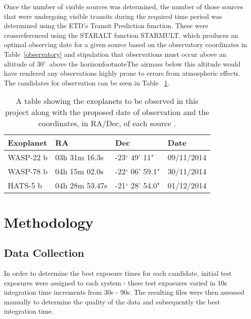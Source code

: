 \documentclass[twoside,4pt]{article}
\begin{document}
\begin{multicols}{2}
Once the number of visible sources was determined, the number of those sources that were undergoing visible transits during the required time period was determined using the ETD's Transit Prediction function. These were crossreferenced using the STARALT function STARMULT, which produces an optimal observing date for a given source based on the observatory coordinates in Table~\ref{observatory} and stipulation that observations must occur above an altitude of 30$^\circ$\ above the horizonfootnote{The airmass below this altitude would have rendered any observations highly prone to errors from atmospheric effects}. The candidates for observation can be seen in Table ~\ref{planets}.

\begin{table}[H]
    \centering
    \begin{tabular}{ | l | l | l | l | }
    \hline \hline
    Exoplanet & RA & Dec & Date       \\ \hline \hline
    WASP-22 b    & 03h 31m 16.3s & -23$^\circ$ 49' 11" & 09/11/2014 \\
    WASP-78 b   & 04h 15m 02.0s & -22$^\circ$ 06' 59.1" & 30/11/2014 \\
    HATS-5 b  & 04h 28m 53.47s & -21$^\circ$ 28' 54.0" & 01/12/2014 \\
    \hline
    \end{tabular}
    \caption{A table showing the exoplanets to be observed in this project along with the proposed date of observation and the coordinates, in RA/Dec, of each source \parencite{etd}.}
    \label{planets}
\end{table}


\section{Methodology}
\subsection{Data Collection}
In order to determine the best exposure times for each candidate, initial test exposures
were assigned to each system - these test exposures varied in 10s integration time
increments from 30s - 90s. The resulting files were then assessed manually to determine
the quality of the data and subsequently the best integration time.


\end{multicols}
\end{document}
